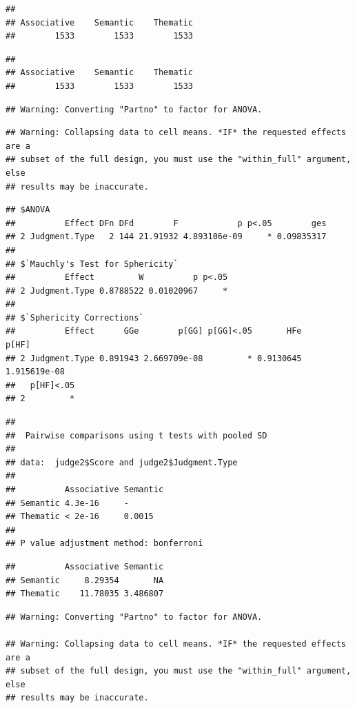 \documentclass[english,,man]{apa6}
\begin{document}
\begin{verbatim}
## 
## Associative    Semantic    Thematic 
##        1533        1533        1533
\end{verbatim}

\begin{verbatim}
## 
## Associative    Semantic    Thematic 
##        1533        1533        1533
\end{verbatim}

\begin{verbatim}
## Warning: Converting "Partno" to factor for ANOVA.
\end{verbatim}

\begin{verbatim}
## Warning: Collapsing data to cell means. *IF* the requested effects are a
## subset of the full design, you must use the "within_full" argument, else
## results may be inaccurate.
\end{verbatim}

\begin{verbatim}
## $ANOVA
##          Effect DFn DFd        F            p p<.05        ges
## 2 Judgment.Type   2 144 21.91932 4.893106e-09     * 0.09835317
## 
## $`Mauchly's Test for Sphericity`
##          Effect         W          p p<.05
## 2 Judgment.Type 0.8788522 0.01020967     *
## 
## $`Sphericity Corrections`
##          Effect      GGe        p[GG] p[GG]<.05       HFe        p[HF]
## 2 Judgment.Type 0.891943 2.669709e-08         * 0.9130645 1.915619e-08
##   p[HF]<.05
## 2         *
\end{verbatim}

\begin{verbatim}
## 
##  Pairwise comparisons using t tests with pooled SD 
## 
## data:  judge2$Score and judge2$Judgment.Type 
## 
##          Associative Semantic
## Semantic 4.3e-16     -       
## Thematic < 2e-16     0.0015  
## 
## P value adjustment method: bonferroni
\end{verbatim}

\begin{verbatim}
##          Associative Semantic
## Semantic     8.29354       NA
## Thematic    11.78035 3.486807
\end{verbatim}

\begin{verbatim}
## Warning: Converting "Partno" to factor for ANOVA.

## Warning: Collapsing data to cell means. *IF* the requested effects are a
## subset of the full design, you must use the "within_full" argument, else
## results may be inaccurate.
\end{verbatim}
\end{document}
